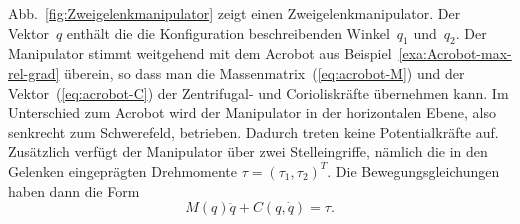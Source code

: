\begin{example}
\label{exa:Zweigelenkmanipulator}Abb.~\ref{fig:Zweigelenkmanipulator}
zeigt einen Zweigelenkmanipulator. Der Vektor~$q$ enthält die die
Konfiguration beschreibenden Winkel~$q_{1}$ und~$q_{2}$. Der Manipulator
stimmt weitgehend mit dem Acrobot aus Beispiel~\ref{exa:Acrobot-max-rel-grad}
überein, so dass man die Massenmatrix~(\ref{eq:acrobot-M}) und der
Vektor~(\ref{eq:acrobot-C}) der Zentrifugal- und Corioliskräfte
übernehmen kann. Im Unterschied zum Acrobot wird der Manipulator in
der horizontalen Ebene, also senkrecht zum Schwerefeld, betrieben.
Dadurch treten keine Potentialkräfte auf. Zusätzlich verfügt der Manipulator
über zwei Stelleingriffe, nämlich die in den Gelenken eingeprägten
Drehmomente $\tau=(\tau_{1},\tau_{2})^{T}$. Die Bewegungsgleichungen
haben dann die Form
\begin{equation}
M(q)\ddot{q}+C(q,\dot{q})=\tau.\label{eq:mani-euler-lagrange}
\end{equation}


\end{example}
